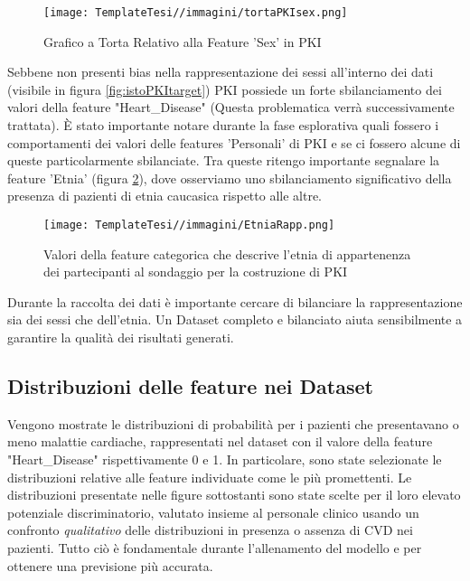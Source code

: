 \begin{flushleft}
\begin{figure}[H]
    \centering
    \texttt{[image: TemplateTesi//immagini/tortaPKIsex.png]}
    \caption{Grafico a Torta Relativo alla Feature 'Sex' in PKI}
    \label{fig:tortaPKIsex}
\end{figure}
Sebbene non presenti bias nella rappresentazione dei sessi all'interno dei dati (visibile in figura \ref{fig:istoPKItarget}) PKI possiede un forte sbilanciamento dei valori della feature "Heart\_Disease" (Questa problematica verrà successivamente trattata). 
È stato importante notare durante la fase esplorativa quali fossero i comportamenti dei valori delle features 'Personali' di PKI e se ci fossero alcune di queste particolarmente sbilanciate.
Tra queste ritengo importante segnalare la feature 'Etnia' (figura \ref{fig:EtniaPKI}), dove osserviamo uno sbilanciamento significativo della presenza di pazienti di etnia caucasica rispetto alle altre.
\begin{figure}[H]
    \centering
    \texttt{[image: TemplateTesi//immagini/EtniaRapp.png]}
    \caption{Valori della feature categorica che descrive l'etnia di appartenenza dei partecipanti al sondaggio per la costruzione di PKI}
    \label{fig:EtniaPKI}
\end{figure}
\end{flushleft}

\begin{flushleft}
    
Durante la raccolta dei dati è importante cercare di bilanciare la rappresentazione sia dei sessi che dell'etnia.
Un Dataset completo e bilanciato aiuta sensibilmente a garantire la qualità dei risultati generati.
\end{flushleft}

\subsection{Distribuzioni delle feature nei Dataset \label{distribuzionisub}}

Vengono mostrate le distribuzioni di probabilità per i pazienti che presentavano o meno malattie cardiache, rappresentati nel dataset con il valore della feature "Heart\_Disease" rispettivamente 0 e 1. In particolare, sono state selezionate le distribuzioni relative alle feature individuate come le più promettenti. Le distribuzioni presentate nelle figure sottostanti sono state scelte per il loro elevato potenziale discriminatorio, valutato insieme al personale clinico usando un confronto \emph{qualitativo} delle distribuzioni in presenza o assenza di CVD nei pazienti.  
Tutto ciò è fondamentale durante l'allenamento del modello e per ottenere una previsione più accurata.

